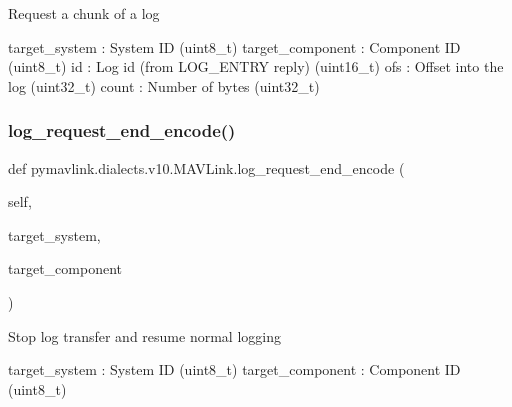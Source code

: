 \begin{DoxyVerb}
\begin{DoxyVerb}
\begin{DoxyVerb}
\begin{DoxyVerb}
\begin{DoxyVerb}Request a chunk of a log

target_system             : System ID (uint8_t)
target_component          : Component ID (uint8_t)
id                        : Log id (from LOG_ENTRY reply) (uint16_t)
ofs                       : Offset into the log (uint32_t)
count                     : Number of bytes (uint32_t)\end{DoxyVerb}
 \mbox{\label{classpymavlink_1_1dialects_1_1v10_1_1MAVLink_a4c1900a7ffb5b8ef7ac90eccac9fe886}} 
\subsubsection{\texorpdfstring{log\+\_\+request\+\_\+end\+\_\+encode()}{log\_request\_end\_encode()}}
{\footnotesize\ttfamily def pymavlink.\+dialects.\+v10.\+M\+A\+V\+Link.\+log\+\_\+request\+\_\+end\+\_\+encode (\begin{DoxyParamCaption}\item[{}]{self,  }\item[{}]{target\+\_\+system,  }\item[{}]{target\+\_\+component }\end{DoxyParamCaption})}

\begin{DoxyVerb}Stop log transfer and resume normal logging

target_system             : System ID (uint8_t)
target_component          : Component ID (uint8_t)\end{DoxyVerb}
 \mbox{\label{classpymavlink_1_1dialects_1_1v10_1_1MAVLink_a36ee9dc492940d4d54b5c0b4d95f3016}} 

\end{DoxyVerb}
\end{DoxyVerb}
\end{DoxyVerb}
\end{DoxyVerb}
